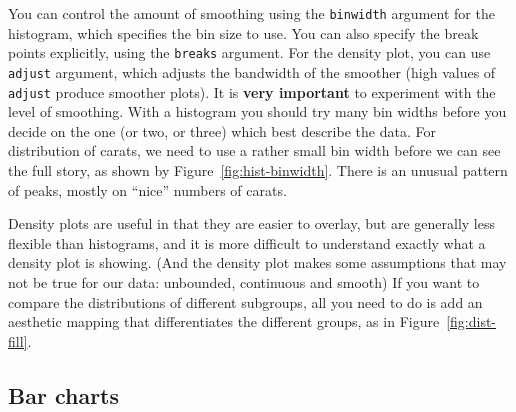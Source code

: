 You can control the amount of smoothing using the {\tt binwidth} argument for the histogram, which specifies the bin size to use.  You can also specify the break points explicitly, using the {\tt breaks} argument.  For the density plot, you can use {\tt adjust} argument, which adjusts the bandwidth of the smoother (high values of {\tt adjust} produce smoother plots).  It is {\bf very important} to experiment with the level of smoothing.  With a histogram you should try many bin widths before you decide on the one (or two, or three) which best describe the data.  For distribution of carats, we need to use a rather small bin width before we can see the full story, as shown by Figure~\ref{fig:hist-binwidth}.  There is an unusual pattern of peaks, mostly on ``nice'' numbers of carats.

%


Density plots are useful in that they are easier to overlay, but are generally less flexible than histograms, and it is more difficult to understand exactly what a density plot is showing.  (And the density plot makes some assumptions that may not be true for our data: unbounded, continuous and smooth)  If you want to compare the distributions of different subgroups, all you need to do is add an aesthetic mapping that differentiates the different groups, as in Figure~\ref{fig:dist-fill}.

% 


\subsection{Bar charts}
\label{sub:bar}

